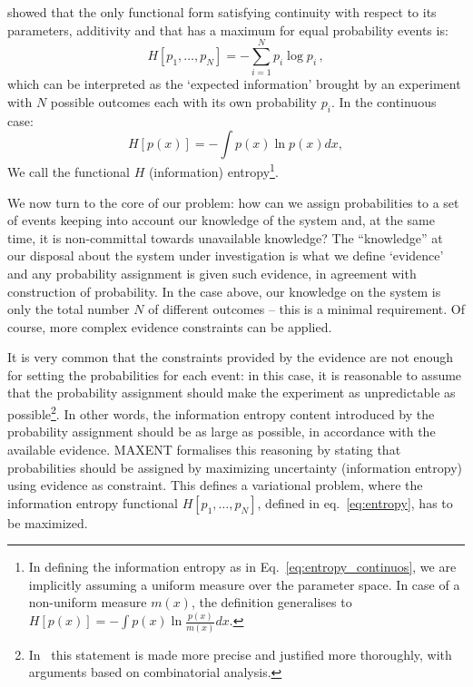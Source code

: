 \documentclass{aa}
\begin{document}
\citet{Shannon} showed that the only functional form satisfying continuity with respect to its parameters, additivity and that has a maximum for equal probability events is:
\begin{equation}\label{eq:entropy}
    H[p_1, \dots, p_N] = - \sum_{i = 1}^N p_i\log{p_i}\,,
\end{equation}
which can be interpreted as the `expected information' brought by an experiment with $N$ possible outcomes each with its own probability $p_i$.
In the continuous case:
\begin{equation} \label{eq:entropy_continuos}
    H[p(x)] = - \int p(x)\ln p(x) dx,
\end{equation}
We call the functional $H$ (information) entropy\footnote{In defining the information entropy as in Eq.~\eqref{eq:entropy_continuos}, we are implicitly assuming a uniform measure over the parameter space. In case of a non-uniform measure $m(x)$, the definition generalises to $ H[p(x)] = - \int p(x)\ln \frac{p(x)}{m(x)} dx$.}.

We now turn to the core of our problem: how can we assign probabilities to a set of events keeping into account our knowledge of the system and, at the same time, it is non-committal towards unavailable knowledge?
The ``knowledge'' at our disposal about the system under investigation is what we define `evidence' and any probability assignment is given such evidence, in agreement with \citet{Cox} construction of probability. In the case above, our knowledge on the system is only the total number $N$ of different outcomes -- this is a minimal requirement. Of course, more complex evidence constraints can be applied.

It is very common that the constraints provided by the evidence are not enough for setting the probabilities for each event: in this case, it is reasonable to assume that the probability assignment should make the experiment as unpredictable as possible\footnote{
In~\citet{Jaynes_MAXENT} this statement is made more precise and justified more thoroughly, with arguments based on combinatorial analysis.
}.
In other words, the information entropy content introduced by the probability assignment should be as large as possible, in accordance with the available evidence. MAXENT formalises this reasoning by stating that probabilities should be assigned by maximizing uncertainty (information entropy) using evidence as constraint. 
This defines a variational problem, where the information entropy functional $H\left[p_1, \dots, p_N\right]$, defined in eq.~\eqref{eq:entropy}, has to be maximized. 
\end{document}
